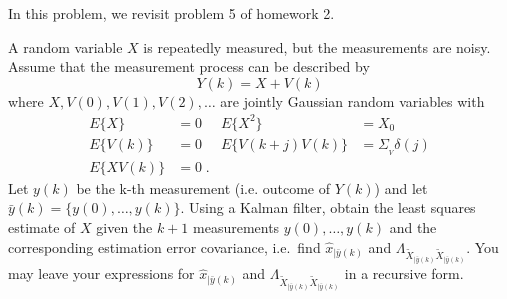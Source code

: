 \item
In this problem, we revisit problem 5 of homework 2.

A random variable $X$ is repeatedly measured, but the measurements are noisy.  Assume that the measurement process can be described by
\begin{equation*}
    Y(k) = X + V(k)
\end{equation*}
where $X, V(0), V(1), V(2), \ldots$ are jointly Gaussian random variables with
\begin{align*}
    E \{ X \} & = 0
        & E \{ X^2 \} & = X_0 \\
    E \{ V(k) \} & = 0
        & E \{ V(k+j) V(k) \} & = \Sigma_{_{V}} \delta(j) \\
    E \{ X V(k) \} & = 0 \; .
\end{align*}
Let $y(k)$ be the k-th measurement (i.e. outcome of $Y(k)$) and let $\bar{y}(k) = \{ y(0),\ldots,y(k) \}$. Using a Kalman filter, obtain the least squares estimate of $X$ given the $k+1$ measurements $y(0), \ldots, y(k)$ and the corresponding estimation error covariance, i.e.\ find $\hat{x}_{|\bar{y}(k)}$ and $\Lambda_{\tilde{X}_{|\bar{y}(k)} \tilde{X}_{|\bar{y}(k)}}$. You may leave your expressions for $\hat{x}_{|\bar{y}(k)}$ and $\Lambda_{\tilde{X}_{|\bar{y}(k)} \tilde{X}_{|\bar{y}(k)}}$ in a recursive form.

